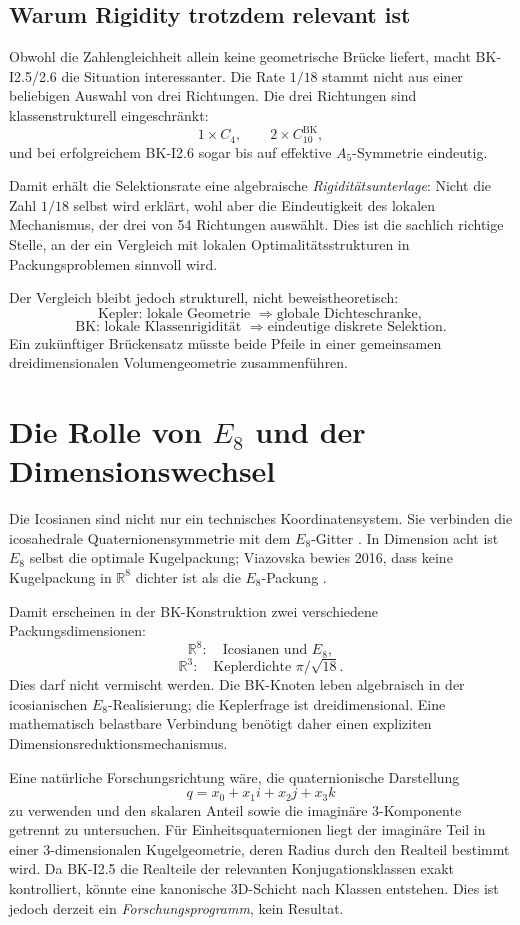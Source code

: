 \documentclass[11pt,a4paper]{article}
\theoremstyle{definition}
\newcommand{\R}{\mathbb R}
\begin{document}
\subsection{Warum Rigidity trotzdem relevant ist}

Obwohl die Zahlengleichheit allein keine geometrische Brücke liefert, macht BK-I2.5/2.6 die Situation interessanter. Die Rate \(1/18\) stammt nicht aus einer beliebigen Auswahl von drei Richtungen. Die drei Richtungen sind klassenstrukturell eingeschränkt:
\[
1\times C_4,\qquad 2\times C_{10}^{\mathrm{BK}},
\]
und bei erfolgreichem BK-I2.6 sogar bis auf effektive \(A_5\)-Symmetrie eindeutig.

Damit erhält die Selektionsrate eine algebraische \emph{Rigiditätsunterlage}: Nicht die Zahl \(1/18\) selbst wird erklärt, wohl aber die Eindeutigkeit des lokalen Mechanismus, der drei von 54 Richtungen auswählt. Dies ist die sachlich richtige Stelle, an der ein Vergleich mit lokalen Optimalitätsstrukturen in Packungsproblemen sinnvoll wird.

Der Vergleich bleibt jedoch strukturell, nicht beweistheoretisch:
\[
\text{Kepler: lokale Geometrie } \Rightarrow \text{globale Dichteschranke},
\]
\[
\text{BK: lokale Klassenrigidität } \Rightarrow \text{eindeutige diskrete Selektion}.
\]
Ein zukünftiger Brückensatz müsste beide Pfeile in einer gemeinsamen dreidimensionalen Volumengeometrie zusammenführen.

\section{Die Rolle von \(E_8\) und der Dimensionswechsel}

Die Icosianen sind nicht nur ein technisches Koordinatensystem. Sie verbinden die icosahedrale Quaternionensymmetrie mit dem \(E_8\)-Gitter \cite{Baez2018}. In Dimension acht ist \(E_8\) selbst die optimale Kugelpackung; Viazovska bewies 2016, dass keine Kugelpackung in \(\R^8\) dichter ist als die \(E_8\)-Packung \cite{Viazovska2017}.

Damit erscheinen in der BK-Konstruktion zwei verschiedene Packungsdimensionen:
\[
\R^8:\quad \text{Icosianen und }E_8,
\]
\[
\R^3:\quad \text{Keplerdichte }\pi/\sqrt{18}.
\]
Dies darf nicht vermischt werden. Die BK-Knoten leben algebraisch in der icosianischen \(E_8\)-Realisierung; die Keplerfrage ist dreidimensional. Eine mathematisch belastbare Verbindung benötigt daher einen expliziten Dimensionsreduktionsmechanismus.

Eine natürliche Forschungsrichtung wäre, die quaternionische Darstellung
\[
q=x_0+x_1i+x_2j+x_3k
\]
zu verwenden und den skalaren Anteil sowie die imaginäre 3-Komponente getrennt zu untersuchen. Für Einheitsquaternionen liegt der imaginäre Teil in einer 3-dimensionalen Kugelgeometrie, deren Radius durch den Realteil bestimmt wird. Da BK-I2.5 die Realteile der relevanten Konjugationsklassen exakt kontrolliert, könnte eine kanonische 3D-Schicht nach Klassen entstehen. Dies ist jedoch derzeit ein \emph{Forschungsprogramm}, kein Resultat.
\end{document}
